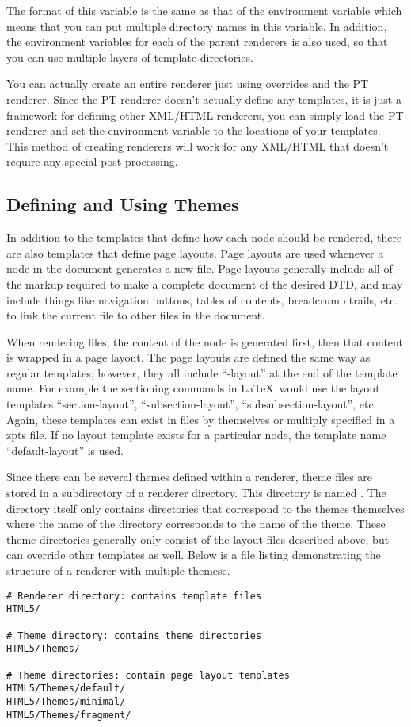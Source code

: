The format of this variable is the same as that of the 
environment variable which means that you can put multiple directory
names in this variable.  In addition, the environment variables for
each of the parent renderers is also used, so that you can use
multiple layers of template directories.

You can actually create an entire renderer just using overrides and the
PT renderer.  Since the PT renderer doesn't actually define any templates,
it is just a framework for defining other XML/HTML renderers, you can
simply load the PT renderer and set the 
environment
variable to the locations of your templates.  This method of creating
renderers will work for any XML/HTML that doesn't require any special
post-processing.


\subsection{Defining and Using Themes}

In addition to the templates that define how each node should be rendered,
there are also templates that define page layouts.  Page layouts are used
whenever a node in the document generates a new file.   Page layouts
generally include all of the markup required to make a complete document
of the desired DTD, and may include things like navigation buttons,
tables of contents, breadcrumb trails, etc. to link the current file to
other files in the document.

When rendering files, the content of the
node is generated first, then that content is wrapped in a page layout.
The page layouts are defined the same way as regular templates; however,
they all include ``-layout'' at the end of the template name.  For
example the sectioning commands in \LaTeX\ would use the layout templates
``section-layout'', ``subsection-layout'', ``subsubsection-layout'', etc.
Again, these templates can exist in files by themselves or multiply
specified in a zpts file.  If no layout template exists for a particular
node, the template name ``default-layout'' is used.

Since there can be several themes defined within a renderer, theme files
are stored in a subdirectory of a renderer directory.  This directory
is named .  The  directory itself only contains
directories that correspond to the themes themselves where the name
of the directory corresponds to the name of the theme.  These theme
directories generally only consist of the layout files described above,
but can override other templates as well.  Below is a file listing
demonstrating the structure of a renderer with multiple themese.
\begin{verbatim}
# Renderer directory: contains template files
HTML5/

# Theme directory: contains theme directories
HTML5/Themes/

# Theme directories: contain page layout templates
HTML5/Themes/default/
HTML5/Themes/minimal/
HTML5/Themes/fragment/
\end{verbatim}

